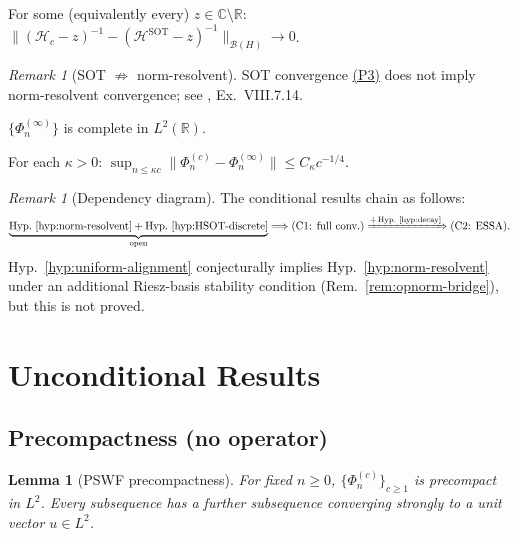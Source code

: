 \documentclass[12pt,a4paper]{amsart}
\newtheorem{lemma}[theorem]{Lemma}
\theoremstyle{definition}
\theoremstyle{remark}
\newtheorem{remark}[theorem]{Remark}
\newcommand{\Hc}{\mathcal{H}_c}
\newcommand{\HSOT}{\mathcal{H}^{\mathrm{SOT}}}
\begin{document}
\begin{hypothesis}
\label{hyp:norm-resolvent}
For some (equivalently every)
$z\in\mathbb{C}\setminus\mathbb{R}$:
$\|(\Hc-z)^{-1}-(\HSOT-z)^{-1}\|_{\mathcal{B}(H)}
\to 0$.
\end{hypothesis}

\begin{remark}[SOT $\not\Rightarrow$ norm-resolvent]
\label{rem:SOT-not-enough}
SOT convergence \hyperref[P3]{(P3)} does not imply
norm-resolvent convergence;
see \cite{ReedSimon1975}, Ex.~VIII.7.14.
\end{remark}

\begin{hypothesis}[Completeness]
\label{hyp:decay}
$\{\Phi_n^{(\infty)}\}$ is complete in $L^2(\mathbb{R})$.
\end{hypothesis}

\begin{hypothesis}
\label{hyp:uniform-alignment}
For each $\kappa>0$:
$\sup_{n\le\kappa c}\|\Phi_n^{(c)}-\Phi_n^{(\infty)}\|
\le C_\kappa c^{-1/4}$.
\end{hypothesis}

\begin{remark}[Dependency diagram]
\label{rem:dep}
The conditional results chain as follows:
\[
  \underbrace{\text{Hyp.~\ref{hyp:norm-resolvent}}
    +\text{Hyp.~\ref{hyp:HSOT-discrete}}}
  _{\text{open}}
  \Longrightarrow
  \text{(C1: full conv.)}
  \xRightarrow{+\,\text{Hyp.~\ref{hyp:decay}}}
  \text{(C2: ESSA)}.
\]
Hyp.~\ref{hyp:uniform-alignment} conjecturally implies
Hyp.~\ref{hyp:norm-resolvent} under an additional
Riesz-basis stability condition
(Rem.~\ref{rem:opnorm-bridge}), but this is not proved.
\end{remark}

\section{Unconditional Results}
\label{sec:unconditional}

\subsection{Precompactness (no operator)}

\begin{lemma}[PSWF precompactness]
\label{lem:pswf-precompact}
For fixed $n\ge 0$, $\{\Phi_n^{(c)}\}_{c\ge 1}$
is precompact in $L^2$.
Every subsequence has a further subsequence converging
strongly to a unit vector $u\in L^2$.
\end{lemma}
\end{document}
